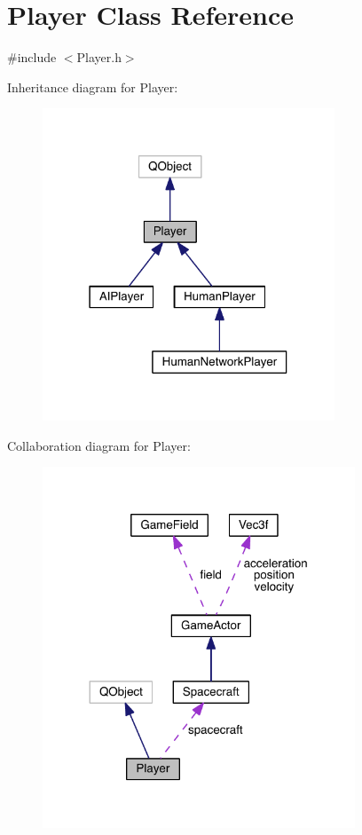 \hypertarget{class_player}{\section{Player Class Reference}
\label{class_player}
}


{\ttfamily \#include $<$Player.\+h$>$}



Inheritance diagram for Player\+:\nopagebreak
\begin{figure}[H]
\begin{center}
\leavevmode
\includegraphics[width=247pt]{class_player__inherit__graph}
\end{center}
\end{figure}


Collaboration diagram for Player\+:\nopagebreak
\begin{figure}[H]
\begin{center}
\leavevmode
\includegraphics[width=264pt]{class_player__coll__graph}
\end{center}
\end{figure}
